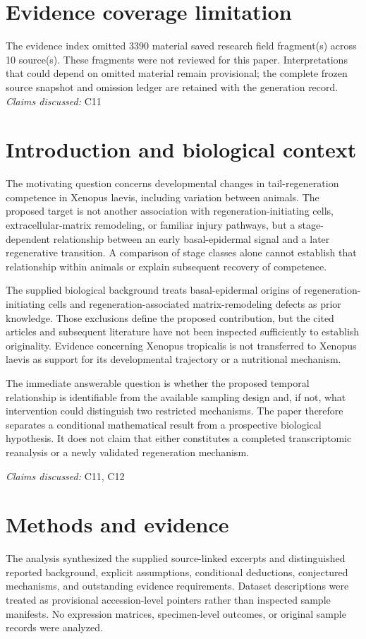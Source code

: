 \documentclass[11pt]{article}
\begin{document}
\section*{Evidence coverage limitation}
The evidence index omitted 3390 material saved research field fragment(s) across 10 source(s). These fragments were not reviewed for this paper. Interpretations that could depend on omitted material remain provisional; the complete frozen source snapshot and omission ledger are retained with the generation record.
\textit{Claims discussed: }C11
\section{Introduction and biological context}
The motivating question concerns developmental changes in tail-regeneration competence in Xenopus laevis, including variation between animals. The proposed target is not another association with regeneration-initiating cells, extracellular-matrix remodeling, or familiar injury pathways, but a stage-dependent relationship between an early basal-epidermal signal and a later regenerative transition. A comparison of stage classes alone cannot establish that relationship within animals or explain subsequent recovery of competence.

The supplied biological background treats basal-epidermal origins of regeneration-initiating cells and regeneration-associated matrix-remodeling defects as prior knowledge. Those exclusions define the proposed contribution, but the cited articles and subsequent literature have not been inspected sufficiently to establish originality. Evidence concerning Xenopus tropicalis is not transferred to Xenopus laevis as support for its developmental trajectory or a nutritional mechanism.

The immediate answerable question is whether the proposed temporal relationship is identifiable from the available sampling design and, if not, what intervention could distinguish two restricted mechanisms. The paper therefore separates a conditional mathematical result from a prospective biological hypothesis. It does not claim that either constitutes a completed transcriptomic reanalysis or a newly validated regeneration mechanism.

\textit{Claims discussed: }C11, C12
\section{Methods and evidence}
The analysis synthesized the supplied source-linked excerpts and distinguished reported background, explicit assumptions, conditional deductions, conjectured mechanisms, and outstanding evidence requirements. Dataset descriptions were treated as provisional accession-level pointers rather than inspected sample manifests. No expression matrices, specimen-level outcomes, or original sample records were analyzed.
\end{document}
